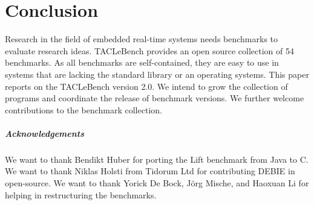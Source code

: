 \documentclass[a4paper,UKenglish]{oasics}
\newcommand{\benchcount}{54 }
\begin{document}
\section{Conclusion}
\label{sec:conclusion}

Research in the field of embedded real-time systems needs benchmarks to
evaluate research ideas. TACLeBench provides an open source collection of
\benchcount benchmarks. As all benchmarks are self-contained, they are easy to
use in systems that are lacking the standard library or an operating systems.
%
This paper reports on the TACLeBench version 2.0.
We intend to grow the collection of programs and coordinate the
release of benchmark versions.
We further welcome contributions to the benchmark collection.



\subparagraph*{Acknowledgements}

We want to thank Bendikt Huber for porting the Lift benchmark from Java to C.
We want to thank Niklas Holsti from Tidorum Ltd for contributing DEBIE in open-source.
We want to thank Yorick De Bock, J{\"o}rg Mische, and Haoxuan Li for helping in restructuring the benchmarks.



\end{document}
